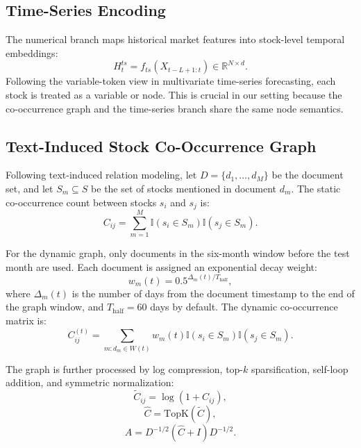 \subsection{Time-Series Encoding}

The numerical branch maps historical market features into stock-level temporal embeddings:
\begin{equation}
H_t^{ts} = f_{ts}(X_{t-L+1:t}) \in \mathbb{R}^{N \times d}.
\end{equation}
Following the variable-token view in multivariate time-series forecasting, each stock is treated as a variable or node. This is crucial in our setting because the co-occurrence graph and the time-series branch share the same node semantics.

\subsection{Text-Induced Stock Co-Occurrence Graph}

Following text-induced relation modeling, let $D = \{d_1, \dots, d_M\}$ be the document set, and let $S_m \subseteq S$ be the set of stocks mentioned in document $d_m$. The static co-occurrence count between stocks $s_i$ and $s_j$ is:
\begin{equation}
C_{ij} = \sum_{m=1}^{M} \mathbb{I}(s_i \in S_m)\mathbb{I}(s_j \in S_m).
\end{equation}

For the dynamic graph, only documents in the six-month window before the test month are used. Each document is assigned an exponential decay weight:
\begin{equation}
w_m(t) = 0.5^{\Delta_m(t)/T_{\text{half}}},
\end{equation}
where $\Delta_m(t)$ is the number of days from the document timestamp to the end of the graph window, and $T_{\text{half}} = 60$ days by default. The dynamic co-occurrence matrix is:
\begin{equation}
C^{(t)}_{ij} = \sum_{m : d_m \in W(t)} w_m(t)\mathbb{I}(s_i \in S_m)\mathbb{I}(s_j \in S_m).
\end{equation}

The graph is further processed by log compression, top-$k$ sparsification, self-loop addition, and symmetric normalization:
\begin{equation}
\tilde{C}_{ij} = \log(1 + C_{ij}),
\end{equation}
\begin{equation}
\hat{C} = \text{TopK}(\tilde{C}),
\end{equation}
\begin{equation}
A = D^{-1/2}(\hat{C}+I)D^{-1/2}.
\end{equation}

